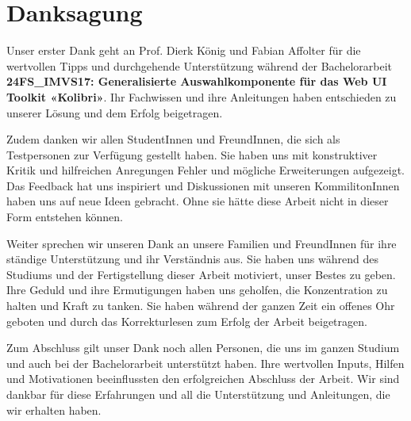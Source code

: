 \chapter*{Danksagung}

Unser erster Dank geht an Prof. Dierk König und Fabian Affolter für die wertvollen Tipps und durchgehende Unterstützung 
während der Bachelorarbeit \textbf{24FS\_IMVS17: Generalisierte Auswahlkomponente für das Web UI Toolkit «Kolibri»}. 
Ihr Fachwissen und ihre Anleitungen haben entschieden zu unserer Lösung und dem Erfolg beigetragen. 

Zudem danken wir allen StudentInnen und FreundInnen, die sich als Testpersonen zur Verfügung gestellt haben. 
Sie haben uns mit konstruktiver Kritik und hilfreichen Anregungen Fehler und mögliche Erweiterungen aufgezeigt. 
Das Feedback hat uns inspiriert und Diskussionen mit unseren KommilitonInnen haben uns auf neue Ideen gebracht. 
Ohne sie hätte diese Arbeit nicht in dieser Form entstehen können. 

Weiter sprechen wir unseren Dank an unsere Familien und FreundInnen für ihre ständige Unterstützung und ihr Verständnis aus. 
Sie haben uns während des Studiums und der Fertigstellung dieser Arbeit motiviert, unser Bestes zu geben. 
Ihre Geduld und ihre Ermutigungen haben uns geholfen, die Konzentration zu halten und Kraft zu tanken. 
Sie haben während der ganzen Zeit ein offenes Ohr geboten und durch das Korrekturlesen zum Erfolg der Arbeit beigetragen. 

Zum Abschluss gilt unser Dank noch allen Personen, die uns im ganzen Studium und auch bei der Bachelorarbeit unterstützt haben. 
Ihre wertvollen Inputs, Hilfen und Motivationen beeinflussten den erfolgreichen Abschluss der Arbeit. 
Wir sind dankbar für diese Erfahrungen und all die Unterstützung und Anleitungen, die wir erhalten haben. 
